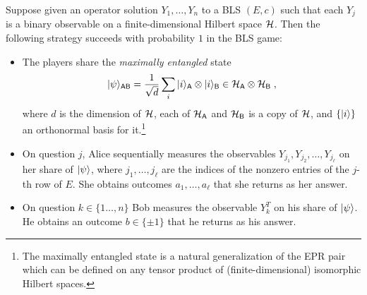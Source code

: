 \begin{lemma}\label{lem:bcs-perfect}
Suppose given an operator solution $Y_1,\ldots,Y_n$ to a BLS $(E,c)$ such that each $Y_j$ is a binary observable on a finite-dimensional Hilbert space $\mathcal{H}$. Then the following strategy succeeds with probability $1$ in the BLS game:
\begin{itemize}
\item The players share the \emph{maximally entangled} state 
\begin{equation}\label{eq:psi-bls}
 |\psi\rangle_{{\textsf{AB}}} = \frac{1}{\sqrt{d}} \sum_{i} |i\rangle_{{\textsf{A}}} \otimes |i\rangle_{{\textsf{B}}} \in \mathcal{H}_{\textsf{A}} \otimes \mathcal{H}_{\textsf{B}}\;,
\end{equation}
 where $d$ is the dimension of $\mathcal{H}$, each of $\mathcal{H}_{\textsf{A}}$ and $\mathcal{H}_{\textsf{B}}$ is a copy of $\mathcal{H}$, and $\{|i\rangle\}$ an orthonormal basis for it.\footnote{The maximally entangled state is a natural generalization of the EPR pair which can be defined on any tensor product of (finite-dimensional) isomorphic Hilbert spaces.}
\item On question $j$, Alice sequentially measures the observables $Y_{j_1},Y_{j_2},\ldots,Y_{j_\ell}$ on her share of $|\psi\rangle$, where $j_1,\ldots,j_\ell$ are the indices of the nonzero entries of the $j$-th row of $E$. She obtains outcomes $a_1,\ldots,a_\ell$ that she returns as her answer. 
\item On question $k \in \{1\ldots,n\}$ Bob measures the observable $Y_{k}^T$ on his share of $|\psi\rangle$. He obtains an outcome $b\in\{\pm 1\}$ that he returns as his answer. 
\end{itemize}
\end{lemma}

